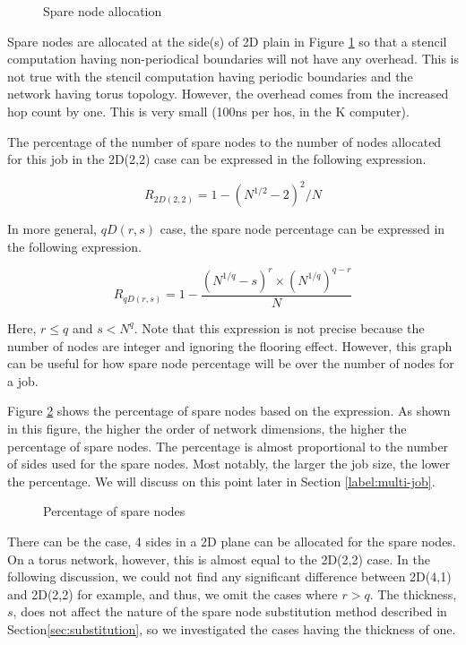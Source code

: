 \documentclass[10pt,conference,a4paper,fleqn]{IEEEtran}
\begin{document}
\begin{figure}[ht]
\begin{center}
  \caption{Spare node allocation} 
  \label{fig:sparenode-allocation}
\end{center}
\end{figure}

Spare nodes are allocated at the side(s) of 2D plain in Figure
\ref{fig:sparenode-allocation} so that a stencil computation
having non-periodical boundaries will not have any overhead. 
This is not true with the stencil computation having periodic
boundaries and the network having torus topology. However, the
overhead comes from the increased hop count by one. This is very small
(100ns per hos, in the K computer). 

The percentage of the number of spare nodes to the number of nodes
allocated for this job in the 2D(2,2) case can be expressed in the
following expression. 

\[
R_{2D(2,2)} = 1 - ( N^{1/2} - 2 )^2 / N
\]

In more general, $qD(r,s)$ case, the spare node percentage can be
expressed in the following expression.

\[
R_{qD(r,s)} = 1 - \frac{ ( N^{1/q} - s )^r \times ( N^{1/q} )^{q-r} }{ N }
\]

Here, $r \leq q$ and $s < N^q$. Note that this expression is not
precise because the number of nodes are integer and ignoring the
flooring effect. However, this graph can be useful for how spare node
percentage will be over the number of nodes for a job. 

Figure \ref{fig:sparenode-percentage} shows the percentage of spare
nodes based on the expression. As shown in this
figure, the higher the order of network dimensions, the higher the
percentage of spare nodes. The percentage is almost proportional to
the number of sides used for the spare nodes. Most notably, the larger
the job size, the lower the percentage. We will discuss on this point
later in Section \ref{label:multi-job}.

\begin{figure}[ht]
\begin{center}
  \caption{Percentage of spare nodes} 
  \label{fig:sparenode-percentage}
\end{center}
\end{figure}

There can be the case, 4 sides in a 2D plane can be allocated for the
spare nodes. On a torus network, however, this is almost equal to the
2D(2,2) case. In the following discussion, we could not find any
significant difference between 2D(4,1) and 2D(2,2) for example, and
thus, we omit the cases where $r > q$. The thickness, $s$, does not
affect the nature of the spare node  substitution method described in
Section\ref{sec:substitution}, so we investigated the cases having the
thickness of one. 
\end{document}
